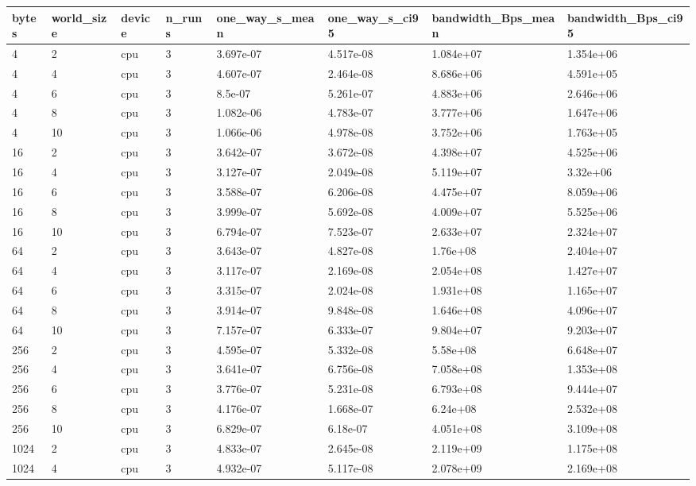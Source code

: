 \begin{tabular}{llllllll}
\hline
bytes & world\_size & device & n\_runs & one\_way\_s\_mean & one\_way\_s\_ci95 & bandwidth\_Bps\_mean & bandwidth\_Bps\_ci95 \\
\hline
4 & 2 & cpu & 3 & 3.697e-07 & 4.517e-08 & 1.084e+07 & 1.354e+06 \\
4 & 4 & cpu & 3 & 4.607e-07 & 2.464e-08 & 8.686e+06 & 4.591e+05 \\
4 & 6 & cpu & 3 & 8.5e-07 & 5.261e-07 & 4.883e+06 & 2.646e+06 \\
4 & 8 & cpu & 3 & 1.082e-06 & 4.783e-07 & 3.777e+06 & 1.647e+06 \\
4 & 10 & cpu & 3 & 1.066e-06 & 4.978e-08 & 3.752e+06 & 1.763e+05 \\
16 & 2 & cpu & 3 & 3.642e-07 & 3.672e-08 & 4.398e+07 & 4.525e+06 \\
16 & 4 & cpu & 3 & 3.127e-07 & 2.049e-08 & 5.119e+07 & 3.32e+06 \\
16 & 6 & cpu & 3 & 3.588e-07 & 6.206e-08 & 4.475e+07 & 8.059e+06 \\
16 & 8 & cpu & 3 & 3.999e-07 & 5.692e-08 & 4.009e+07 & 5.525e+06 \\
16 & 10 & cpu & 3 & 6.794e-07 & 7.523e-07 & 2.633e+07 & 2.324e+07 \\
64 & 2 & cpu & 3 & 3.643e-07 & 4.827e-08 & 1.76e+08 & 2.404e+07 \\
64 & 4 & cpu & 3 & 3.117e-07 & 2.169e-08 & 2.054e+08 & 1.427e+07 \\
64 & 6 & cpu & 3 & 3.315e-07 & 2.024e-08 & 1.931e+08 & 1.165e+07 \\
64 & 8 & cpu & 3 & 3.914e-07 & 9.848e-08 & 1.646e+08 & 4.096e+07 \\
64 & 10 & cpu & 3 & 7.157e-07 & 6.333e-07 & 9.804e+07 & 9.203e+07 \\
256 & 2 & cpu & 3 & 4.595e-07 & 5.332e-08 & 5.58e+08 & 6.648e+07 \\
256 & 4 & cpu & 3 & 3.641e-07 & 6.756e-08 & 7.058e+08 & 1.353e+08 \\
256 & 6 & cpu & 3 & 3.776e-07 & 5.231e-08 & 6.793e+08 & 9.444e+07 \\
256 & 8 & cpu & 3 & 4.176e-07 & 1.668e-07 & 6.24e+08 & 2.532e+08 \\
256 & 10 & cpu & 3 & 6.829e-07 & 6.18e-07 & 4.051e+08 & 3.109e+08 \\
1024 & 2 & cpu & 3 & 4.833e-07 & 2.645e-08 & 2.119e+09 & 1.175e+08 \\
1024 & 4 & cpu & 3 & 4.932e-07 & 5.117e-08 & 2.078e+09 & 2.169e+08 \\

\end{tabular}
